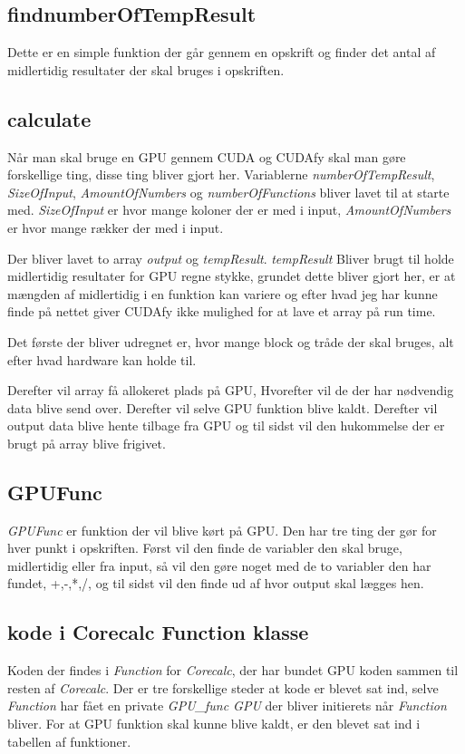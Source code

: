 \subsection{findnumberOfTempResult}
Dette er en simple funktion der går gennem en opskrift og finder det antal af midlertidig resultater der skal bruges i opskriften.

\subsection{calculate}
Når man skal bruge en GPU gennem CUDA og CUDAfy skal man gøre forskellige ting, disse ting bliver gjort her. Variablerne \textit{numberOfTempResult}, \textit{SizeOfInput}, \textit{AmountOfNumbers} og \textit{numberOfFunctions} bliver lavet til at starte med. \textit{SizeOfInput} er hvor mange koloner der er med i input, \textit{AmountOfNumbers} er hvor mange rækker der med i input.

Der bliver lavet to array \textit{output} og \textit{tempResult}. \textit{tempResult} Bliver brugt til holde midlertidig resultater for GPU regne stykke, grundet dette bliver gjort her, er at mængden af midlertidig i en funktion kan variere og efter hvad jeg har kunne finde på nettet giver CUDAfy ikke mulighed for at lave et array på run time.

Det første der bliver udregnet er, hvor mange block og tråde der skal bruges, alt efter hvad hardware kan holde til.

Derefter vil array få allokeret plads på GPU, Hvorefter vil de der har nødvendig data blive send over. Derefter vil selve GPU funktion blive kaldt. Derefter vil output data blive hente tilbage fra GPU og til sidst vil den hukommelse der er brugt på array blive frigivet.

\subsection{GPUFunc}
\textit{GPUFunc} er funktion der vil blive kørt på GPU. Den har tre ting der gør for hver punkt i opskriften. Først vil den finde de variabler den skal bruge, midlertidig eller fra input, så vil den gøre noget med de to variabler den har fundet, +,-,*,/, og til sidst vil den finde ud af hvor output skal lægges hen.


\subsection{kode i Corecalc Function klasse}
Koden der findes i \textit{Function} for \textit{Corecalc}, der har bundet GPU koden sammen til resten af \textit{Corecalc}. Der er tre forskellige steder at kode er blevet sat ind, selve \textit{Function} har fået en private \textit{GPU\_func GPU} der bliver initierets når \textit{Function} bliver. For at GPU funktion skal kunne blive kaldt, er den blevet sat ind i tabellen af funktioner.


